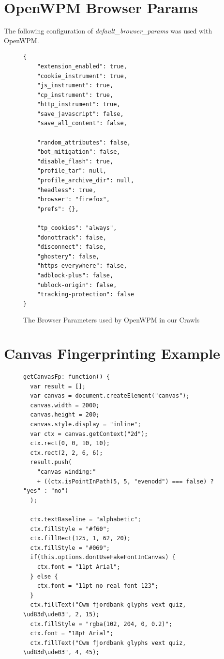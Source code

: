 \documentclass[
    fontsize=12pt,
    headings=small,
    parskip=half,
    bibliography=totoc,
    numbers=noenddot,
    open=any
    ]{scrreprt}
\begin{document}
\begin{appendices}

\chapter{OpenWPM Browser Params}
The following configuration of \textit{default\_browser\_params} was used with OpenWPM.



\begin{figure}
\label{app:params}
\begin{verbatim}
{
    "extension_enabled": true,
    "cookie_instrument": true,
    "js_instrument": true,
    "cp_instrument": true,
    "http_instrument": true,
    "save_javascript": false,
    "save_all_content": false,

    "random_attributes": false,
    "bot_mitigation": false,
    "disable_flash": true,
    "profile_tar": null,
    "profile_archive_dir": null,
    "headless": true,
    "browser": "firefox",
    "prefs": {},

    "tp_cookies": "always",
    "donottrack": false,
    "disconnect": false,
    "ghostery": false,
    "https-everywhere": false,
    "adblock-plus": false,
    "ublock-origin": false,
    "tracking-protection": false
}
\end{verbatim}
\caption{The Browser Parameters used by OpenWPM in our Crawls}
\end{figure}


\chapter{Canvas Fingerprinting Example}
\begin{figure}
\begin{verbatim}
getCanvasFp: function() {
  var result = [];
  var canvas = document.createElement("canvas");
  canvas.width = 2000;
  canvas.height = 200;
  canvas.style.display = "inline";
  var ctx = canvas.getContext("2d");
  ctx.rect(0, 0, 10, 10);
  ctx.rect(2, 2, 6, 6);
  result.push(
    "canvas winding:"
    + ((ctx.isPointInPath(5, 5, "evenodd") === false) ? "yes" : "no")
  );

  ctx.textBaseline = "alphabetic";
  ctx.fillStyle = "#f60";
  ctx.fillRect(125, 1, 62, 20);
  ctx.fillStyle = "#069";
  if(this.options.dontUseFakeFontInCanvas) {
    ctx.font = "11pt Arial";
  } else {
    ctx.font = "11pt no-real-font-123";
  }
  ctx.fillText("Cwm fjordbank glyphs vext quiz, \ud83d\ude03", 2, 15);
  ctx.fillStyle = "rgba(102, 204, 0, 0.2)";
  ctx.font = "18pt Arial";
  ctx.fillText("Cwm fjordbank glyphs vext quiz, \ud83d\ude03", 4, 45);


\end{verbatim}
\end{figure}
\end{appendices}
\end{document}
